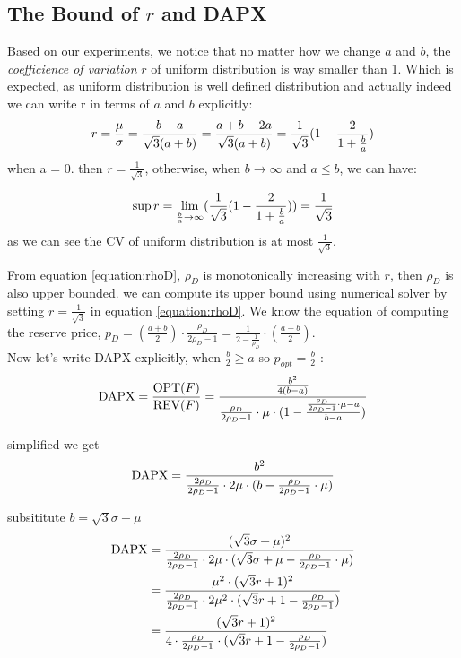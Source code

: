 \subsection{The Bound of $r$ and DAPX}
Based on our experiments, we notice that no matter how we change $a$ and $b$, the \textit{coefficience of variation} $r$ of uniform distribution is way smaller than 1. Which is expected, as uniform distribution is well defined distribution and actually indeed we can write r in terms of $a$ and $b$ explicitly:
\begin{equation}\notag
r = \frac{\mu}{\sigma} = \frac {b-a}{\sqrt{3}(a+b)} = \frac {a+b-2a}{\sqrt{3}(a+b)} = \frac {1}{\sqrt{3}} (1-  \frac {2}{1+\frac{b}{a}})
\end{equation} 
when a = 0. then $r = \frac {1}{\sqrt{3}}$, otherwise, when $b \rightarrow \infty$ and $a\leqslant b$, we can have:

\begin{equation}\notag
\sup r = \displaystyle{\lim_{\frac{b}{a} \to \infty}}(\frac {1}{\sqrt{3}} (1-  \frac {2}{1+\frac{b}{a}})) = \frac {1}{\sqrt{3}}  
\end{equation} 
as we can see the CV of uniform distribution is at most $\frac {1}{\sqrt{3}}$.

From  equation \ref{equation:rhoD}, $\rho_D$ is monotonically increasing with $r$, then $\rho_D$ is also upper bounded. we can compute its upper bound using numerical solver by setting $r = \frac {1}{\sqrt{3}}$ in equation \ref{equation:rhoD}. We know the equation of computing the reserve price, $p_D =  (\frac{a+b}{2}) \cdot \frac{\rho_{D}}{2\rho_{D}-1} =\frac{1}{2-\frac{1}{\rho_D}}\cdot (\frac{a+b}{2})$. \\
Now let's write DAPX explicitly, when $\frac{b}{2} \geqslant a$ so $p_{opt} = \frac{b}{2}$ : 
\begin{equation}\notag
\text{DAPX} = \frac{\text{OPT}(F)}{\text{REV}(F)} =  \frac{\frac{b^{2}}{4(b-a)}}{\frac{\rho_{D}}{2\rho_{D}-1}\cdot \mu \cdot (1-\frac{\frac{\rho_{D}}{2\rho_{D}-1}\cdot \mu -a}{b-a})}
\end{equation} 

simplified we get 
\begin{equation}\notag
\text{DAPX}=\frac{b^{2}}{\frac{2\rho_{D}}{2\rho_{D}-1}\cdot 2\mu \cdot(b-\frac{\rho_{D}}{2\rho_{D}-1}\cdot \mu)}
\end{equation} 

subsititute $b = \sqrt{3}\sigma + \mu $
\begin{equation}\notag
	\begin{split}	
		\text{DAPX} &=\frac{( \sqrt{3}\sigma + \mu)^{2}}{\frac{2\rho_{D}}{2\rho_{D}-1}\cdot 2\mu \cdot( \sqrt{3}\sigma + \mu-\frac{\rho_{D}}{2\rho_{D}-1}\cdot \mu)} \\&= \frac{\mu^2 \cdot( \sqrt{3}r +1)^{2}}{\frac{2\rho_{D}}{2\rho_{D}-1}\cdot 2\mu^2 \cdot( \sqrt{3}r+ 1-\frac{\rho_{D}}{2\rho_{D}-1})}\\ 
		&= \frac{ ( \sqrt{3}r +1)^{2}}{4 \cdot \frac{ \rho_{D}}{2\rho_{D}-1}\cdot( \sqrt{3}r+ 1-\frac{\rho_{D}}{2\rho_{D}-1})}	
	\end{split}
\end{equation} 

